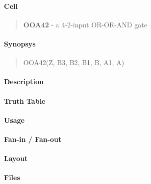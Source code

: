 \label{OOA42}
\paragraph{Cell}
\begin{quote}
    \textbf{OOA42} - a 4-2-input OR-OR-AND gate
\end{quote}

\paragraph{Synopsys}
\begin{quote}
    OOA42(Z, B3, B2, B1, B, A1, A)
\end{quote}

\paragraph{Description}

%

\paragraph{Truth Table}
%

\paragraph{Usage}

\paragraph{Fan-in / Fan-out}

\paragraph{Layout}

\paragraph{Files}
